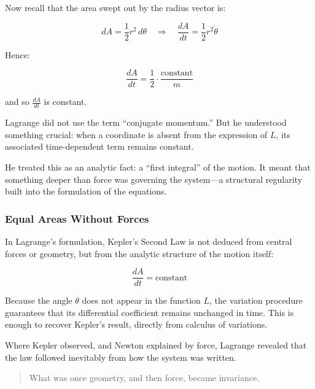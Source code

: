 \medskip

Now recall that the area swept out by the radius vector is:

\[
dA = \frac{1}{2} r^2 \, d\theta \quad \Rightarrow \quad \frac{dA}{dt} = \frac{1}{2} r^2 \dot{\theta}
\]

Hence:

\[
\frac{dA}{dt} = \frac{1}{2} \cdot \frac{\text{constant}}{m}
\]

and so \( \frac{dA}{dt} \) is constant.

\begin{tcolorbox}[colback=gray!5!white, colframe=black, title=\textbf{Historical Sidebar: A Quantity Conserved by Omission}]

Lagrange did not use the term “conjugate momentum.” But he understood something crucial: when a coordinate is absent from the expression of \( L \), its associated time-dependent term remains constant.

He treated this as an analytic fact: a “first integral” of the motion. It meant that something deeper than force was governing the system—a structural regularity built into the formulation of the equations.

\end{tcolorbox}

\subsubsection*{Equal Areas Without Forces}

In Lagrange’s formulation, Kepler’s Second Law is not deduced from central forces or geometry, but from the analytic structure of the motion itself:

\[
\frac{dA}{dt} = \text{constant}
\]

Because the angle \( \theta \) does not appear in the function \( L \), the variation procedure guarantees that its differential coefficient remains unchanged in time. This is enough to recover Kepler’s result, directly from calculus of variations.

\medskip

Where Kepler observed,
and Newton explained by force,
Lagrange revealed that the law followed inevitably from how the system was written.

\begin{quote}
What was once geometry, and then force, became invariance.
\end{quote}
